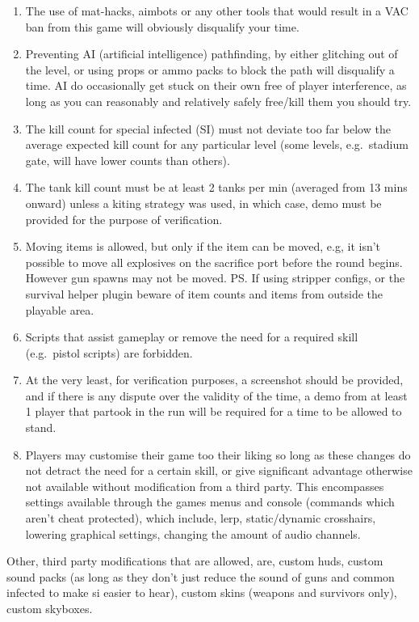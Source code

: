 \begin{enumerate}
\item The use of mat-hacks, aimbots or any other tools that would result in a VAC ban from this game will obviously disqualify your time.
\item  Preventing AI (artificial intelligence) pathfinding, by either glitching out of the level, or using props or ammo packs to block the path will disqualify a time. AI do occasionally get stuck on their own free of player interference, as long as you can reasonably and relatively safely free/kill them you should try.
\item  The kill count for special infected (SI) must not deviate too far below the average expected kill count for any particular level (some levels, e.g.\ stadium gate, will have lower counts than others).
\item  The tank kill count must be at least 2 tanks per min (averaged from 13 mins onward) unless a kiting strategy was used, in which case, demo must be provided for the purpose of verification.
\item Moving items is allowed, but only if the item can be moved, e.g, it isn't possible to move all explosives on the sacrifice port before the round begins. However gun spawns may not be moved. PS. If using stripper configs, or the survival helper plugin beware of item counts and items from outside the playable area.
\item Scripts that assist gameplay or remove the need for a required skill (e.g.\ pistol scripts) are forbidden.
\item At the very least, for verification purposes, a screenshot should be provided, and if there is any dispute over the validity of the time, a demo from at least 1 player that partook in the run will be required for a time to be allowed to stand.
\item Players may customise their game too their liking so long as these changes do not detract the need for a certain skill, or give significant advantage otherwise not available without modification from a third party. This encompasses settings available through the games menus and console (commands which aren't cheat protected), which include, lerp, static/dynamic crosshairs, lowering graphical settings, changing the amount of audio channels. 
\end{enumerate}

Other, third party modifications that are allowed, are, custom huds, custom sound packs (as long as they don't just reduce the sound of guns and common infected to make si easier to hear), custom skins (weapons and survivors only), custom skyboxes.

